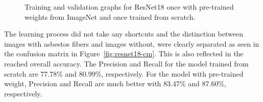 \begin{figure}[!h]
\centering
\caption{Training and validation graphs for ResNet18 once with pre-trained weights from ImageNet and once trained from scratch.}
\label{fig:resnet18-graph}
\end{figure}

The learning process did not take any shortcuts and the distinction between images with asbestos fibers and images without, were clearly separated as seen in the confusion matrix in Figure~\ref{fig:resnet18-cm}. This is also reflected in the reached overall accuracy. The Precision and Recall for the model trained from scratch are 77.78\% and 80.99\%, respectively. For the model with pre-trained weight, Precision and Recall are much better with 83.47\% and 87.60\%, respectively. \\

